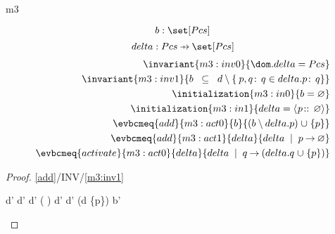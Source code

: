 \documentclass[12pt]{amsart}
\begin{document}
\begin{machine}{m3}

	\[ \variable{b : \set[Pcs]} \]
	\[ \variable{delta : Pcs \pfun \set [Pcs]} \]
\begin{align}
	\invariant{m3:inv0}{ \dom.delta = Pcs } \\
	\invariant{m3:inv1}{ b \2\subseteq d \setminus \qset{p,q}{q \in delta.p}{q} } \\
	\initialization{m3:in0}{ b = \emptyset } \\
	\initialization{m3:in1}{ delta = \qfun{p}{}{\emptyset} } \\
	\evbcmeq{add}{m3:act0}{b}{(b\setminus delta.p) \bunion \{p\}} \\
	\evbcmeq{add}{m3:act1}{delta}{delta \2| p \fun \emptyset }  \\
	\evbcmeq{activate}{m3:act0}{delta}{delta \2| q \fun (delta.q \bunion \{p\})}
\end{align}
\begin{proof}{\ref{add}/INV/\ref{m3:inv1}}
\begin{calculation}
	d' \setminus {}
\hint{=}{ \eqref{m3:act1} }
	d' \setminus {}
	d' \setminus ( \bunion {})
	d' \setminus {}
	d' \setminus {}
\hint{=}{ \eqref{m2:act0} }
	(d \bunion \{p\}) \setminus {}
\hint{\supseteq}{}
	b'
\end{calculation}
\end{proof}
\end{machine}
\end{document}
